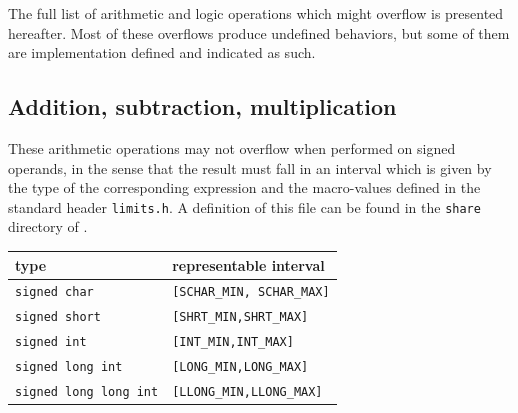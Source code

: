 The full list of arithmetic and logic operations which might overflow is
presented hereafter.  Most of these overflows produce undefined behaviors, but
some of them are implementation defined and indicated as such.

\subsection{Addition, subtraction, multiplication}

These arithmetic operations may not overflow when performed on signed operands,
in the sense that the result must fall in an interval which is given by the type
of the corresponding expression and the macro-values defined in the standard
header \lstinline|limits.h|.  A definition of this file can be found in the
\lstinline|share| directory of \framac{}.

\medskip

\begin{center}
\begin{tabular}{|l|l|}
\hline
type & representable interval \\
\hline
\lstinline|signed char| & \lstinline|[SCHAR_MIN, SCHAR_MAX]|  \\
\lstinline|signed short| & \lstinline|[SHRT_MIN,SHRT_MAX]| \\
\lstinline|signed int| & \lstinline|[INT_MIN,INT_MAX]| \\
\lstinline|signed long int| & \lstinline|[LONG_MIN,LONG_MAX]| \\
\lstinline|signed long long int| & \lstinline|[LLONG_MIN,LLONG_MAX]| \\
\hline
\end{tabular}
\end{center}

\medskip

